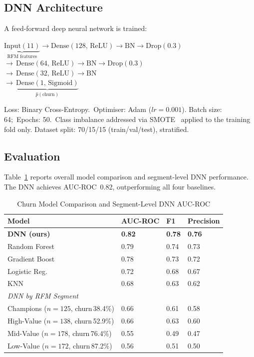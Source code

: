 \documentclass[conference]{IEEEtran}
\begin{document}
\subsection{DNN Architecture}

A feed-forward deep neural network is trained:
\begin{center}
\small
$\underbrace{\text{Input}(11)}_{\text{RFM features}} \!\to\!
 \text{Dense}(128,\,\text{ReLU}) \!\to\! \text{BN} \!\to\! \text{Drop}(0.3)$\\
$\to\, \text{Dense}(64,\,\text{ReLU}) \to \text{BN} \to \text{Drop}(0.3)$\\
$\to\, \text{Dense}(32,\,\text{ReLU}) \to \text{BN}$\\
$\to\, \underbrace{\text{Dense}(1,\,\text{Sigmoid})}_{\hat{p}(\text{churn})}$
\end{center}
Loss: Binary Cross-Entropy.\ Optimiser: Adam ($lr\!=\!0.001$).
Batch size: 64;\ Epochs: 50.\ Class imbalance addressed via
SMOTE~\cite{chawla2002smote} applied to the training fold only.
Dataset split: 70/15/15 (train/val/test), stratified.

\subsection{Evaluation}

Table~\ref{tab:churn} reports overall model comparison and segment-level DNN performance.
The DNN achieves AUC-ROC~0.82, outperforming all four baselines.

\begin{table}[H]
\centering
\caption{Churn Model Comparison and Segment-Level DNN AUC-ROC}
\label{tab:churn}
\scriptsize
\begin{tabular}{@{}llll@{}}
\toprule
\textbf{Model} & \textbf{AUC-ROC} & \textbf{F1} & \textbf{Precision} \\
\midrule
\textbf{DNN (ours)} & \textbf{0.82} & \textbf{0.78} & \textbf{0.76} \\
Random Forest   & 0.79 & 0.74 & 0.73 \\
Gradient Boost  & 0.78 & 0.73 & 0.72 \\
Logistic Reg.   & 0.72 & 0.68 & 0.67 \\
KNN             & 0.68 & 0.63 & 0.62 \\
\midrule
\multicolumn{4}{l}{\textit{DNN by RFM Segment}} \\
Champions ($n\!=\!125$, churn\,38.4\%)  & 0.66 & 0.61 & 0.58 \\
High-Value ($n\!=\!138$, churn\,52.9\%) & 0.66 & 0.63 & 0.60 \\
Mid-Value ($n\!=\!178$, churn\,76.4\%)  & 0.55 & 0.49 & 0.47 \\
Low-Value ($n\!=\!172$, churn\,87.2\%)  & 0.56 & 0.51 & 0.50 \\
\bottomrule
\end{tabular}
\end{table}
\end{document}
